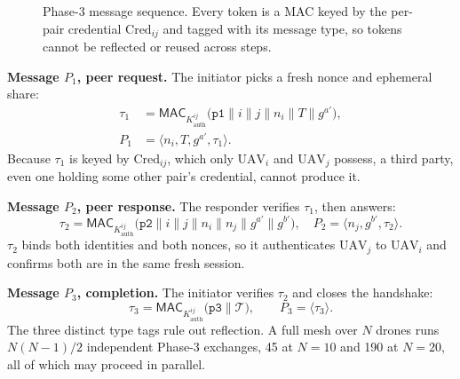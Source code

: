 \documentclass[journal]{IEEEtran}
\begin{document}
\begin{figure}[H]
\centering
{}
\caption{Phase-3 message sequence. Every token is a MAC keyed by the per-pair
credential $\text{Cred}_{ij}$ and tagged with its message type, so tokens
cannot be reflected or reused across steps.}
\label{fig:phase3}
\end{figure}

\textbf{Message $P_1$, peer request.} The initiator picks a fresh nonce and
ephemeral share:
\begin{align}
\tau_1 &= \mathsf{MAC}_{K^{ij}_{\text{auth}}}\big(\texttt{p1} \| i \| j \| n_i \| T \| g^{a'}\big),\\
P_1 &= \langle n_i, T, g^{a'}, \tau_1 \rangle.
\end{align}
Because $\tau_1$ is keyed by $\text{Cred}_{ij}$, which only $\text{UAV}_i$ and
$\text{UAV}_j$ possess, a third party, even one holding some other pair's
credential, cannot produce it.

\textbf{Message $P_2$, peer response.} The responder verifies $\tau_1$, then
answers:
\begin{equation}
\tau_2 = \mathsf{MAC}_{K^{ij}_{\text{auth}}}\big(\texttt{p2} \| i \| j \| n_i \| n_j \| g^{a'} \| g^{b'}\big), \quad
P_2 = \langle n_j, g^{b'}, \tau_2 \rangle.
\end{equation}
$\tau_2$ binds both identities and both nonces, so it authenticates
$\text{UAV}_j$ to $\text{UAV}_i$ and confirms both are in the same fresh
session.

\textbf{Message $P_3$, completion.} The initiator verifies $\tau_2$ and closes
the handshake:
\begin{equation}
\tau_3 = \mathsf{MAC}_{K^{ij}_{\text{auth}}}\big(\texttt{p3} \| \mathcal{T}\big), \qquad
P_3 = \langle \tau_3 \rangle.
\end{equation}
The three distinct type tags rule out reflection. A full mesh over $N$ drones
runs $N(N-1)/2$ independent Phase-3 exchanges, 45 at $N=10$ and 190 at $N=20$,
all of which may proceed in parallel.
\end{document}
